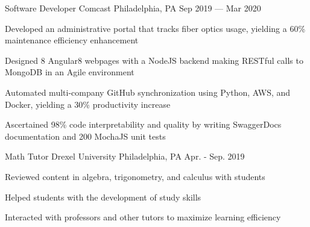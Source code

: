 \begin{cventries}
  \cventry
    {Software Developer} %
    {Comcast} %
    {Philadelphia, PA} %
    {Sep 2019 --- Mar 2020} %
    {
      \begin{cvitems} %
        \item{Developed an administrative portal that tracks fiber optics usage, yielding a 60\% maintenance efficiency enhancement}
        \item{Designed 8 Angular8 webpages with a NodeJS backend making RESTful calls to MongoDB in an Agile environment}
        \item{Automated multi-company GitHub synchronization using Python, AWS, and Docker, yielding a 30\% productivity increase}
        \item{Ascertained 98\% code interpretability and quality by writing SwaggerDocs documentation and 200 MochaJS unit tests}
      \end{cvitems}
    }
    
    \cventry
    {Math Tutor} %
    {Drexel University} %
    {Philadelphia, PA} %
    {Apr. - Sep. 2019} %
    {
      \begin{cvitems} %
        \item{Reviewed content in algebra, trigonometry, and calculus with students}
        \item{Helped students with the development of study skills}
        \item{Interacted with professors and other tutors to maximize learning efficiency}
      \end{cvitems}
    }
\end{cventries}
